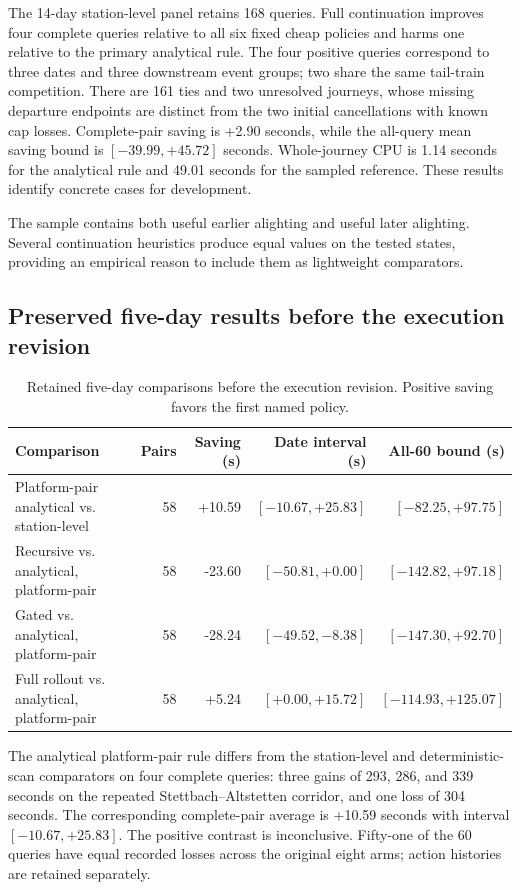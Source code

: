 \documentclass[preprint,12pt,authoryear]{elsarticle}
\begin{document}
The 14-day station-level panel retains 168 queries. Full continuation improves
four complete queries relative to all six fixed cheap policies and harms one
relative to the primary analytical rule. The four positive queries correspond
to three dates and three downstream event groups; two share the same tail-train
competition. There are 161 ties and two unresolved journeys, whose missing
departure endpoints are distinct from the two initial cancellations with known
cap losses. Complete-pair saving is +2.90 seconds, while the all-query
mean saving bound is $[-39.99,+45.72]$ seconds. Whole-journey CPU is 1.14
seconds for the analytical rule and 49.01 seconds for the sampled
reference. These results identify concrete cases for development.

The sample contains both useful earlier alighting and useful later alighting.
Several continuation heuristics produce equal values on the tested states,
providing an empirical reason to include them as lightweight comparators.

\subsection{Preserved five-day results before the execution revision}
\begin{table}[ht]
\centering\small\setlength{\tabcolsep}{4pt}
\caption{Retained five-day comparisons before the execution revision. Positive saving favors the first named policy.}
\begin{tabular}{p{}rrrr}
\toprule
Comparison & Pairs & Saving (s) & Date interval (s) & All-60 bound (s) \\
\midrule
Platform-pair analytical vs. station-level & 58 & +10.59 & $[-10.67,+25.83]$ & $[-82.25,+97.75]$ \\
Recursive vs. analytical, platform-pair & 58 & -23.60 & $[-50.81,+0.00]$ & $[-142.82,+97.18]$ \\
Gated vs. analytical, platform-pair & 58 & -28.24 & $[-49.52,-8.38]$ & $[-147.30,+92.70]$ \\
Full rollout vs. analytical, platform-pair & 58 & +5.24 & $[+0.00,+15.72]$ & $[-114.93,+125.07]$ \\
\bottomrule
\end{tabular}
\end{table}

The analytical platform-pair rule differs from the station-level and
deterministic-scan comparators on four complete queries: three gains of
293, 286, and 339 seconds on the repeated Stettbach--Altstetten corridor, and
one loss of 304 seconds. The corresponding complete-pair average is
+10.59 seconds with interval $[-10.67,+25.83]$. The positive contrast is inconclusive.
Fifty-one of the 60 queries have equal recorded losses across the original
eight arms; action histories are retained separately.
\end{document}
